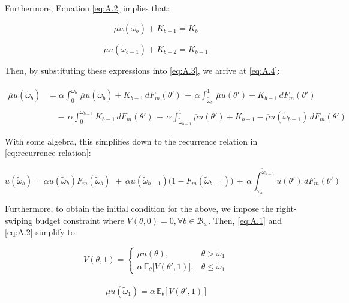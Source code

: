 Furthermore, Equation \ref{eq:A.2} implies that:

$$
\overline\mu u(\widetilde\omega_b) +K_{b-1}= K_b
$$

$$
\overline\mu u(\widetilde\omega_{b-1}) +K_{b-2}=K_{b-1}
$$

Then, by substituting these expressions into \ref{eq:A.3}, we arrive at \ref{eq:A.4}:

\begin{equation}\label{eq:A.4}
    \begin{split}
        \overline\mu u(\widetilde\omega_b) &=\alpha \int^{\widetilde\omega_b}_0\,\overline\mu u(\widetilde\omega_b) +K_{b-1}\,dF_m(\theta') \,+\, \alpha \int^1_{\widetilde\omega_b} \,\overline\mu u(\theta') + K_{b-1}\,dF_m(\theta')\\ 
                                           & \quad -\,\alpha \int^{\widetilde\omega_{b-1}}_0 K_{b-1}\,dF_m(\theta') \,-\, \alpha \int^1_{\widetilde\omega_{b-1}} \overline\mu u(\theta') + K_{b-1}-\overline\mu u(\widetilde\omega_{b-1})\,dF_m(\theta')
    \end{split}
\end{equation}

With some algebra, this simplifies down to the recurrence relation in \autoref{eq:recurrence relation}: 

\begin{equation}
    u(\widetilde\omega_b)=\alpha   u(\widetilde\omega_b)F_m(\widetilde\omega_b) \,  \,+\,\alpha  u(\widetilde\omega_{b-1})\Big(1  - F_m(\widetilde\omega_{b-1})\Big) \,+\, \alpha\int^{\widetilde\omega_{b-1}}_{\widetilde\omega_b} u(\theta') \,dF_m(\theta') 
\end{equation}

Furthermore, to obtain the initial condition for the above, we impose the right-swiping budget constraint where $V(\theta,0)=0, \forall b\in \mathcal{B}_w$. Then, \ref{eq:A.1} and \ref{eq:A.2} simplify to:

\begin{equation}\label{eq:A.5}
    V(\theta, 1)=\begin{cases} 
        \overline\mu u(\theta),& \theta> \widetilde \omega_1 \\ 
        \alpha \,\mathbb{E}_{\theta}\Big[V(\theta', 1)\Big],& \theta\leq\widetilde \omega_1
    \end{cases}  
\end{equation}\\ 

\begin{equation}\label{eq:A.6}
    \overline\mu u(\widetilde\omega_1) = \alpha \, \mathbb{E}_\theta\Big[\,V(\theta',1)\,\Big]  
\end{equation}

